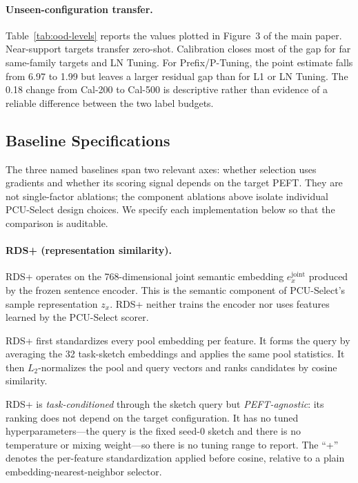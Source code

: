 \paragraph{Unseen-configuration transfer.}
Table~\ref{tab:ood-levels} reports the values plotted in Figure~3 of the main paper.
Near-support targets transfer zero-shot.
Calibration closes most of the gap for far same-family targets and LN Tuning.
For Prefix/P-Tuning, the point estimate falls from 6.97 to 1.99 but leaves a
larger residual gap than for L1 or LN Tuning. The 0.18 change from Cal-200 to
Cal-500 is descriptive rather than evidence of a reliable difference between
the two label budgets.



\subsection{Baseline Specifications}
\label{sec:appendix-baselines}

The three named baselines span two relevant axes: whether selection uses
gradients and whether its scoring signal depends on the target PEFT. They are
not single-factor ablations; the component ablations above isolate individual
PCU-Select design choices. We specify each implementation below so that the
comparison is auditable.

\paragraph{RDS+ (representation similarity).}
RDS+ operates on the 768-dimensional joint semantic embedding
$e_x^{\text{joint}}$ produced by the frozen sentence encoder. This is the
semantic component of PCU-Select's sample representation $z_x$. RDS+ neither
trains the encoder nor uses features learned by the PCU-Select scorer.

RDS+ first standardizes every pool embedding per feature. It forms the query by
averaging the 32 task-sketch embeddings and applies the same pool statistics. It
then $L_2$-normalizes the pool and query vectors and ranks candidates by cosine
similarity.

RDS+ is \emph{task-conditioned} through the sketch query but
\emph{PEFT-agnostic}: its ranking does not depend on the target configuration.
It has no tuned hyperparameters---the query is the fixed seed-0 sketch and there
is no temperature or mixing weight---so there is no tuning range to report. The
``+'' denotes the per-feature standardization applied before cosine, relative to
a plain embedding-nearest-neighbor selector.

